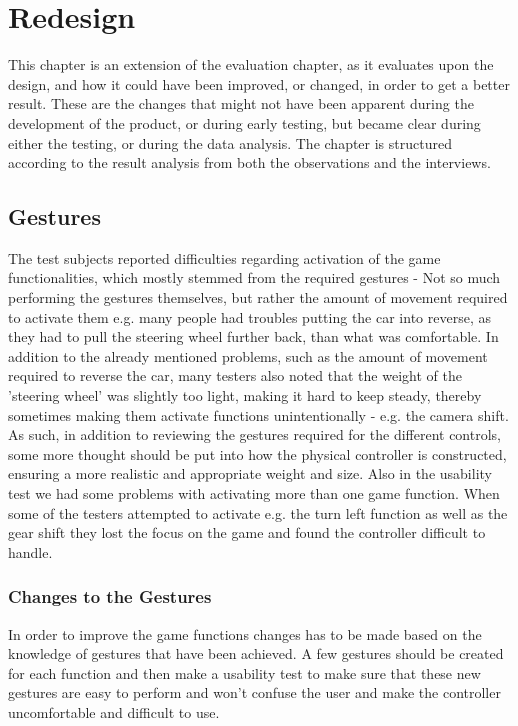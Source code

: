 \section{Redesign} \label{sec:redesign}
This chapter is an extension of the evaluation chapter, as it evaluates upon the design, and how it could have been improved, or changed, in order to get a better result. These are the changes that might not have been apparent during the development of the product, or during early testing, but became clear during either the testing, or during the data analysis. The chapter is structured according to the result analysis from both the observations and the interviews.

\subsection{Gestures}
The test subjects reported difficulties regarding activation of the game functionalities, which mostly stemmed from the required gestures - Not so much performing the gestures themselves, but rather the amount of movement required to activate them e.g. many people had troubles putting the car into reverse, as they had to pull the steering wheel further back, than what was comfortable.
In addition to the already mentioned problems, such as the amount of movement required to reverse the car, many testers also noted that the weight of the 'steering wheel' was slightly too light, making it hard to keep steady, thereby sometimes making them activate functions unintentionally - e.g. the camera shift.
As such, in addition to reviewing the gestures required for the different controls, some more thought should be put into how the physical controller is constructed, ensuring a more realistic and appropriate weight and size.
Also in the usability test we had some problems with activating more than one game function. When some of the testers attempted to activate e.g. the turn left function as well as the gear shift they lost the focus on the game and found the controller difficult to handle.


\subsubsection*{Changes to the Gestures}
In order to improve the game functions changes has to be made based on the knowledge of gestures that have been achieved. A few gestures should be created for each function and then make a usability test to make sure that these new gestures are easy to perform and won’t confuse the user and make the controller uncomfortable and difficult to use.

